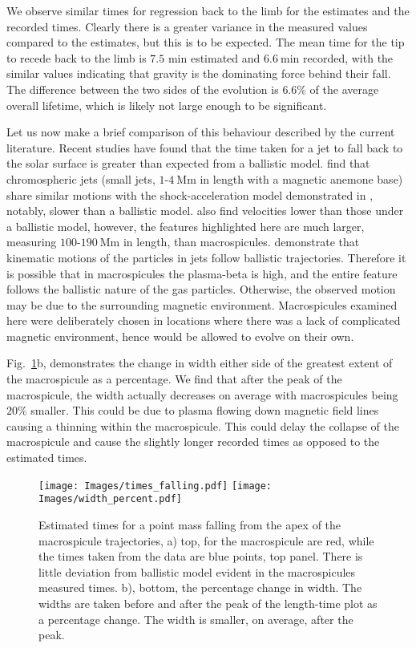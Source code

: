 We observe similar times for regression back to the limb for the estimates and the recorded times. Clearly there is a greater variance in the measured values compared to the estimates, but this is to be expected. The mean time for the tip to recede back to the limb is $7.5$ min estimated and $6.6\ \textrm{min}$ recorded, with the similar values indicating that gravity is the dominating force behind their fall. The difference between the two sides of the evolution is $6.6\%$ of the average overall lifetime, which is likely not large enough to be significant. 

Let us now make a brief comparison of this behaviour described by the current literature. Recent studies have found that the time taken for a jet to fall back to the solar surface is greater than expected from a ballistic model. \citealt{Nishizuka2011} find that chromospheric jets (small jets, $1$-$4\ \textrm{Mm}$ in length with a magnetic anemone base) share similar motions with the shock-acceleration model demonstrated in \cite{ShibataSuematsu1982}, notably, slower than a ballistic model. \citealt{Moschou2013} also find velocities lower than those under a ballistic model, however, the features highlighted here are much larger, measuring $100$-$190\ \textrm{Mm}$ in length, than macrospicules. \citealt{Feng2012} demonstrate that kinematic motions of the particles in jets follow ballistic trajectories. Therefore it is possible that in macrospicules the plasma-beta is high, and the entire feature follows the ballistic nature of the gas particles. Otherwise, the observed motion may be due to the surrounding magnetic environment. Macrospicules examined here were deliberately chosen in locations where there was a lack of complicated magnetic environment, hence would be allowed to evolve on their own.



Fig.~\ref{fig:ballistics}b, demonstrates the change in width either side of the greatest extent of the macrospicule as a percentage. We find that after the peak of the macrospicule, the width actually decreases on average with macrospicules being $20\%$ smaller. This could be due to plasma flowing down magnetic field lines causing a thinning within the macrospicule. This could delay the collapse of the macrospicule and cause the slightly longer recorded times as opposed to the estimated times.       

\begin{figure}[h!]
	\centering
	\texttt{[image: Images/times\_falling.pdf]}
	\texttt{[image: Images/width\_percent.pdf]}
	
	\caption{\small Estimated times for a point mass falling from the apex of the macrospicule trajectories, a) top, for the macrospicule are red, while the times taken from the data are blue points, top panel. There is little deviation from ballistic model evident in the macrospicules measured times. b), bottom, the percentage change in width. The widths are taken before and after the peak of the length-time plot as a percentage change. The width is smaller, on average, after the peak.}
	\label{fig:ballistics}
\end{figure}

